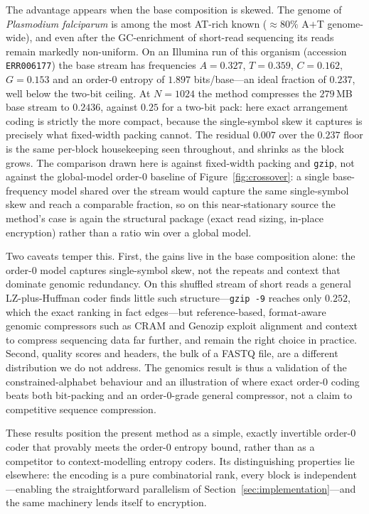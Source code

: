 \documentclass[entropy,article,submit,oneauthor,pdftex]{Definitions/mdpi}
\begin{document}
The advantage appears when the base composition is skewed. The genome of
\emph{Plasmodium falciparum} is among the most AT-rich known
(${\approx}80\%$ A$+$T genome-wide), and even after the GC-enrichment of
short-read sequencing its reads remain markedly non-uniform. On an Illumina run of
this organism (accession \texttt{ERR006177}) the base stream has frequencies
$A{=}0.327$, $T{=}0.359$, $C{=}0.162$, $G{=}0.153$ and an order-$0$ entropy of
$1.897$ bits/base---an ideal fraction of $0.237$, well below the two-bit ceiling.
At $N{=}1024$ the method compresses the $279$\,MB base stream to $0.2436$, against
$0.25$ for a two-bit pack: here exact arrangement coding is strictly the more
compact, because the single-symbol skew it captures is precisely what fixed-width
packing cannot. The residual $0.007$ over the $0.237$ floor is the same per-block
housekeeping seen throughout, and shrinks as the block grows. The comparison drawn
here is against fixed-width packing and \texttt{gzip}, not against the global-model
order-$0$ baseline of Figure~\ref{fig:crossover}: a single base-frequency model shared
over the stream would capture the same single-symbol skew and reach a comparable fraction,
so on this near-stationary source the method's case is again the structural package
(exact read sizing, in-place encryption) rather than a ratio win over a global model.

Two caveats temper this. First, the gains live in the base composition alone:
the order-$0$ model captures single-symbol skew, not the repeats and context that
dominate genomic redundancy. On this shuffled stream of short reads a general
LZ-plus-Huffman coder finds little such structure---\texttt{gzip\,-9} reaches only
$0.252$, which the exact ranking in fact edges---but reference-based, format-aware
genomic compressors such as CRAM and Genozip exploit alignment and context to
compress sequencing data far further, and remain the right choice in practice.
Second, quality scores and headers, the bulk of a FASTQ file, are a different
distribution we do not address. The genomics result is thus a validation of the
constrained-alphabet behaviour and an illustration of where exact order-$0$ coding
beats both bit-packing and an order-$0$-grade general compressor, not a claim to
competitive sequence compression.

These results position the present method as a simple, exactly invertible
order-$0$ coder that provably meets the order-$0$ entropy bound, rather than as a
competitor to context-modelling entropy coders. Its distinguishing properties lie
elsewhere: the encoding is a pure combinatorial rank, every block is
independent---enabling the straightforward parallelism of
Section~\ref{sec:implementation}---and the same machinery lends itself to
encryption.
\end{document}
